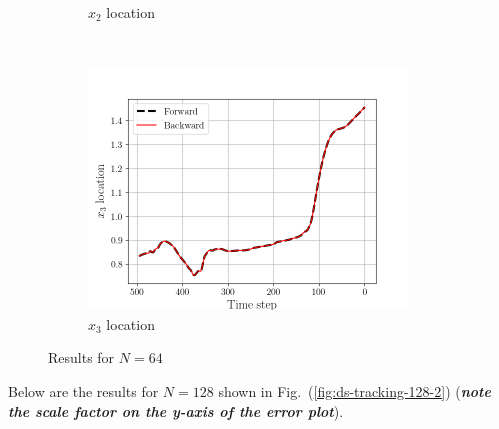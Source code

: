 \begin{figure}[H]
\begin{subfigure}[H]{0.45\textwidth}
        \caption{$x_{2}$ location}
    \end{subfigure}
    ~
    \begin{subfigure}[H]{0.45\textwidth}
        \includegraphics[height=2.5in]{media/rk4/DS-N-64/x3-location.png}
        \caption{$x_{3}$ location}
    \end{subfigure}
    \caption{Results for $N=64$}
    \label{fig:ds-tracking-64-2}
\end{figure}
\newpage 
Below are the results for $N=128$ shown in
Fig.~(\ref{fig:ds-tracking-128-2}) (\emph{\textbf{note the scale factor on the
y-axis of the error plot}}).
